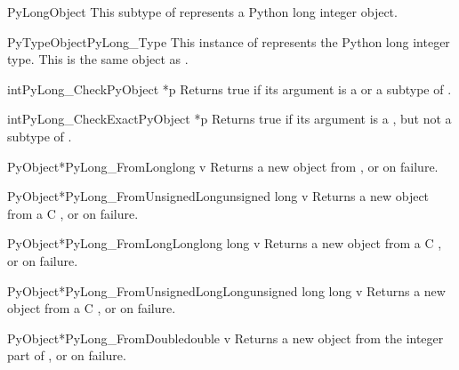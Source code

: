 \begin{ctypedesc}{PyLongObject}
  This subtype of  represents a Python long integer
  object.
\end{ctypedesc}

\begin{cvardesc}{PyTypeObject}{PyLong_Type}
  This instance of  represents the Python long
  integer type.  This is the same object as .
\end{cvardesc}

\begin{cfuncdesc}{int}{PyLong_Check}{PyObject *p}
  Returns true if its argument is a  or a subtype
  of .
\end{cfuncdesc}

\begin{cfuncdesc}{int}{PyLong_CheckExact}{PyObject *p}
  Returns true if its argument is a , but not a
  subtype of .
\end{cfuncdesc}

\begin{cfuncdesc}{PyObject*}{PyLong_FromLong}{long v}
  Returns a new  object from , or \NULL{}
  on failure.
\end{cfuncdesc}

\begin{cfuncdesc}{PyObject*}{PyLong_FromUnsignedLong}{unsigned long v}
  Returns a new  object from a C , or \NULL{} on failure.
\end{cfuncdesc}

\begin{cfuncdesc}{PyObject*}{PyLong_FromLongLong}{long long v}
  Returns a new  object from a C ,
  or \NULL{} on failure.
\end{cfuncdesc}

\begin{cfuncdesc}{PyObject*}{PyLong_FromUnsignedLongLong}{unsigned long long v}
  Returns a new  object from a C , or \NULL{} on failure.
\end{cfuncdesc}

\begin{cfuncdesc}{PyObject*}{PyLong_FromDouble}{double v}
  Returns a new  object from the integer part of
  , or \NULL{} on failure.
\end{cfuncdesc}

